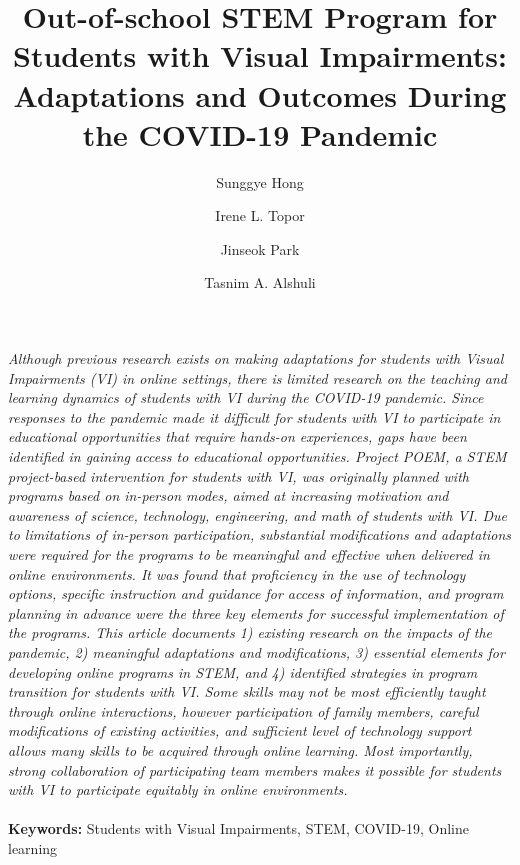\documentclass[11pt]{sig-alternate}
\makeatletter
\let\oldabstract\abstract
\let\oldendabstract\endabstract
\renewenvironment{abstract}
{\renewenvironment{quotation}%
               {\list{}{\addtolength{\leftmargin}{1em} %
                        \listparindent 1.5em%
                        \itemindent    \listparindent%
                        \rightmargin   \leftmargin%
                        \parsep        \z@ \@plus\p@}%
                \item\relax}%
               {\endlist}%
\oldabstract}
{\oldendabstract}
\makeatother
\begin{document}
\title{Out-of-school STEM Program for Students with Visual Impairments: Adaptations and Outcomes During the COVID-19 Pandemic}

\author[1]{\large \color{blue}Sunggye Hong}
\author[1]{\large \color{blue}Irene L. Topor}
\author[1]{\large \color{blue}Jinseok Park}
\author[1]{\large \color{blue}Tasnim A. Alshuli}


\toappear{}

\maketitle
\begin{@twocolumnfalse} 

\begin{abstract}
     \textit{Although previous research exists on making adaptations for students with Visual Impairments (VI) in online settings, there is limited research on the teaching and learning dynamics of students with VI during the COVID-19 pandemic. Since responses to the pandemic made it difficult for students with VI to participate in educational opportunities that require hands-on experiences, gaps have been identified in gaining access to educational opportunities. Project POEM, a STEM project-based intervention for students with VI, was originally planned with programs based on in-person modes, aimed at increasing motivation and awareness of science, technology, engineering, and math of students with VI. Due to limitations of in-person participation, substantial modifications and adaptations were required for the programs to be meaningful and effective when delivered in online environments. It was found that proficiency in the use of technology options, specific instruction and guidance for access of information, and program planning in advance were the three key elements for successful implementation of the programs. This article documents 1) existing research on the impacts of the pandemic, 2) meaningful adaptations and modifications, 3) essential elements for developing online programs in STEM, and 4) identified strategies in program transition for students with VI. Some skills may not be most efficiently taught through online interactions, however participation of family members, careful modifications of existing activities, and sufficient level of technology support allows many skills to be acquired through online learning. Most importantly, strong collaboration of participating team members makes it possible for students with VI to participate equitably in online environments.}
     \\\\
     \textbf{Keywords:} Students with Visual Impairments, STEM, COVID-19, Online learning
\end{abstract}
\end{@twocolumnfalse}
\end{document}
